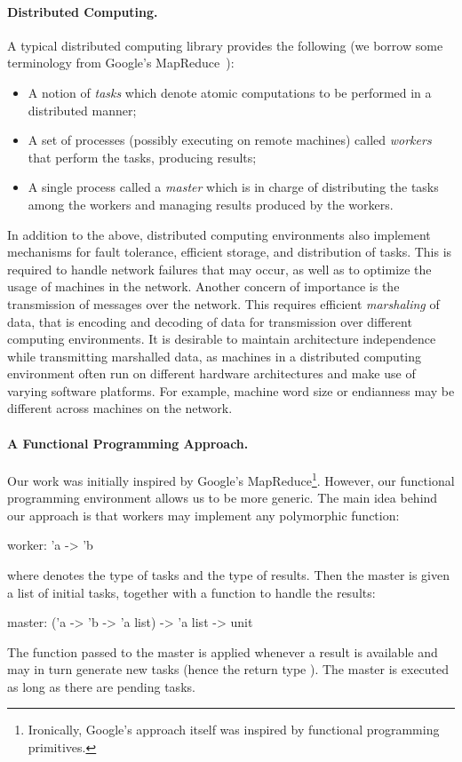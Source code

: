 \documentclass[a4paper,12pt]{article}
\begin{document}
\paragraph{Distributed Computing.}
A typical distributed computing library provides the following (we
borrow some terminology from Google's MapReduce~\cite{mapreduce}):
\begin{itemize}
\item A notion of \emph{tasks} which denote atomic computations
  to be performed in a distributed manner; 
\item A set of processes (possibly executing on remote machines)
  called \emph{workers} that perform
  the tasks, producing results;
\item A single process called a \emph{master} which is in charge
  of distributing the tasks among the workers and managing results
  produced by the workers.
\end{itemize}
In addition to the above, distributed computing environments also
implement mechanisms for fault tolerance, efficient storage, and
distribution of tasks. This is required to handle network failures
that may occur, as well as to optimize the usage of machines in the
network. Another concern of importance is the transmission of messages
over the network. This requires efficient 
\emph{marshaling} of data, that is encoding and decoding of data 
for transmission over different computing environments.  It is desirable to
maintain architecture independence while transmitting marshalled data,
as machines in a distributed computing environment often run on
different hardware architectures and make use of varying software
platforms. For example, machine word size or endianness may be different
across machines on the network.

\paragraph{A Functional Programming Approach.}
Our work was initially inspired by Google's
MapReduce\footnote{Ironically, Google's approach itself was inspired
  by functional programming primitives.}. However, our functional
programming environment allows us to be more generic. 
The main idea behind our approach is that
workers may implement any polymorphic function:
\begin{ocaml}
  worker: 'a -> 'b
\end{ocaml}
where  denotes the type of tasks and  the type of results.
Then the master is given a list of initial tasks, together with a
function to handle the results:
\begin{ocaml}
  master: ('a -> 'b -> 'a list) -> 'a list -> unit
\end{ocaml}
The function passed to the master is applied whenever a result is
available and may in turn generate new tasks (hence the return type
).  The master is executed as long as there are pending
tasks.
\end{document}

